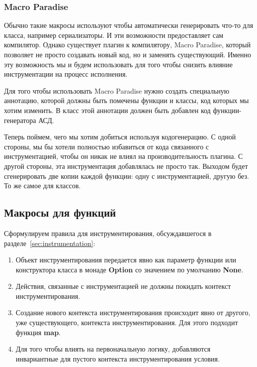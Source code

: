 \subsubsection{Macro Paradise}

Обычно такие макросы используют чтобы автоматически генерировать что-то для
класса, например сериализаторы.
И эти возможности предоставляет сам компилятор.
Однако существует плагин к компилятору, Macro Paradise, который позволяет не
просто создавать новый код, но и заменять существующий.
Именно эту возможность мы и будем использовать для того чтобы снизить влияние
инструментации на процесс исполнения.

Для того чтобы использовать Macro Paradise нужно создать специальную аннотацию,
которой должны быть помечены функции и классы, код которых мы хотим изменить.
В класс этой аннотации должен быть добавлен код функции-генератора АСД.

Теперь поймем, чего мы хотим добиться используя кодогенерацию.
С одной стороны, мы бы хотели полностью избавиться от кода связанного с инструментацией,
чтобы он никак не влиял на производительность плагина.
С другой стороны, эта инструментация добавлялась не просто так.
Выходом будет сгенерировать две копии каждой функции: одну с инструментацией,
другую без.
То же самое для классов.

\subsection{Макросы для функций}
\label{sec:macroFunction}

Сформулируем правила для инструментирования, обсуждавшегося в
разделе~\ref{sec:instrumentation}:
\begin{enumerate}
  \item
  \label{itm:ins-constructor}
  Объект инструментирования передается явно как параметр функции или
  конструктора класса в монаде \textbf{Option} со значением по умолчанию
  \textbf{None}.
  \item
  \label{itm:ins-context}
  Действия, связанные с инструментацией не должны покидать контекст
  инструментирования.
  \item
  \label{itm:ins-creating}
  Создание нового контекста инструментирования происходит явно от другого,
  уже существующего, контекста инструментирования.
  Для этого подходит функция \textbf{map}.
  \item
  \label{itm:ins-logic}
  Для того чтобы влиять на первоначальную логику, добавляются
  инвариантные для пустого контекста инструментирования условия.
\end{enumerate}

